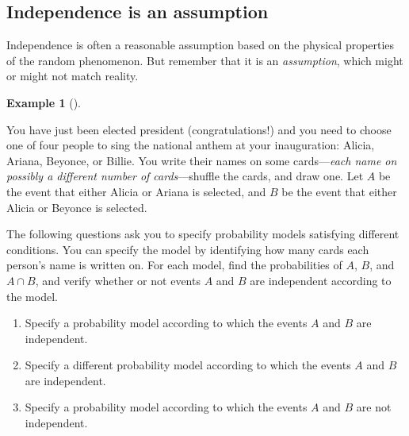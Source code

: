 \documentclass[
  letterpaper,
  DIV=11,
  numbers=noendperiod]{scrreprt}
\providecommand{\tightlist}{%
  \setlength{\itemsep}{0pt}\setlength{\parskip}{0pt}}
\theoremstyle{plain}
\theoremstyle{definition}
\newtheorem{example}{Example}[chapter]
\theoremstyle{definition}
\theoremstyle{definition}
\theoremstyle{remark}
\begin{document}
\subsection{Independence is an
assumption}\label{sec-independence-is-an-assumption}

Independence is often a reasonable assumption based on the physical
properties of the random phenomenon. But remember that it is an
\emph{assumption}, which might or might not match reality.

\begin{tcolorbox}[enhanced jigsaw, opacityback=0, left=2mm, colframe=quarto-callout-note-color-frame, toprule=.15mm, breakable, colback=white, leftrule=.75mm, arc=.35mm, rightrule=.15mm, bottomrule=.15mm]

\begin{example}[]\protect\hypertarget{exm-independent-probmeasure}{}\label{exm-independent-probmeasure}

You have just been elected president (congratulations!) and you need to
choose one of four people to sing the national anthem at your
inauguration: Alicia, Ariana, Beyonce, or Billie. You write their names
on some cards---\emph{each name on possibly a different number of
cards}---shuffle the cards, and draw one. Let \(A\) be the event that
either Alicia or Ariana is selected, and \(B\) be the event that either
Alicia or Beyonce is selected.

The following questions ask you to specify probability models satisfying
different conditions. You can specify the model by identifying how many
cards each person's name is written on. For each model, find the
probabilities of \(A\), \(B\), and \(A\cap B\), and verify whether or
not events \(A\) and \(B\) are independent according to the model.

\begin{enumerate}
\def\labelenumi{\arabic{enumi}.}
\tightlist
\item
  Specify a probability model according to which the events \(A\) and
  \(B\) are independent.
\item
  Specify a different probability model according to which the events
  \(A\) and \(B\) are independent.
\item
  Specify a probability model according to which the events \(A\) and
  \(B\) are not independent.
\end{enumerate}

\end{example}

\end{tcolorbox}
\end{document}
